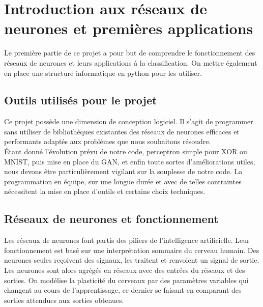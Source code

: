 

\chapter{Introduction aux réseaux de neurones et premières applications}

Le première partie de ce projet a pour but de comprendre le fonctionnement des réseaux de neurones et leurs applications à la classification. On mettre également en place une structure informatique en python pour les utiliser.

\section{Outils utilisés pour le projet}

Ce projet possède une dimension de conception logiciel. Il s'agit de programmer sans utiliser de bibliothèques existantes des réseaux de neurones efficaces et performants adaptés aux problèmes que nous souhaitons résoudre.\\
Étant donné l'évolution prévu de notre code, perceptron simple pour XOR ou  MNIST, puis mise en place du GAN, et enfin toute sortes d'améliorations utiles, nous devons être particulièrement vigilant sur la souplesse de notre code. La programmation en équipe, sur une longue durée et avec de telles contraintes nécessitent la mise en place d'outils et certains choix techniques.

\section{Réseaux de neurones et fonctionnement}

Les réseaux de neurones font partis des piliers de l'intelligence artificielle. Leur fonctionnement est basé sur une interprétation sommaire du cerveau humain. Des neurones seules reçoivent des signaux, les traitent et renvoient un signal de sortie. Les neurones sont alors agrégés en réseaux avec des entrées du réseaux et des sorties. On modélise la plasticité du cerveaux par des paramètres variables qui changent au cours de l'apprentissage, ce dernier se faisant en comparant des sorties attendues aux sorties obtenues.

